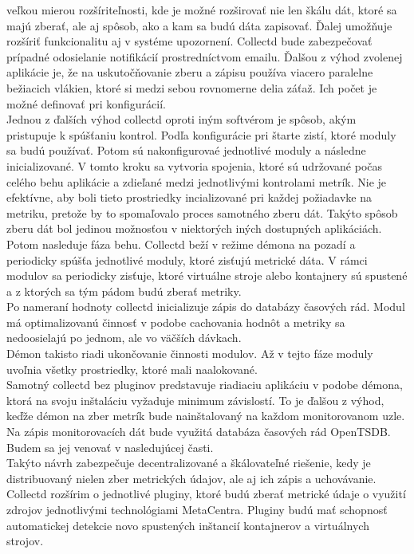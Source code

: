 \documentclass[printed,11pt,twoside,color,cover,table]{fithesis3}
\begin{document}
veľkou mierou rozšíriteľnosti, kde je možné rozširovať nie len škálu dát, ktoré sa majú zberať, ale aj spôsob, ako a kam sa budú dáta zapisovať. Ďalej umožňuje rozšíriť funkcionalitu
aj v systéme upozornení. Collectd bude zabezpečovať prípadné odosielanie notifikácií prostredníctvom emailu. Ďalšou z výhod zvolenej aplikácie je, že na uskutočňovanie zberu a zápisu používa viacero
paralelne bežiacich vlákien, ktoré si medzi sebou rovnomerne delia záťaž. Ich počet je možné definovať pri konfigurácií. 
\\Jednou z ďalších výhod collectd oproti iným softvérom je spôsob, akým pristupuje k spúšťaniu kontrol. Podľa konfigurácie pri štarte zistí, ktoré moduly sa budú používať. Potom sú nakonfigurovaé 
jednotlivé moduly a následne inicializované. V tomto kroku sa vytvoria spojenia, ktoré sú udržované počas celého behu aplikácie a zdieľané medzi jednotlivými kontrolami metrík. Nie je efektívne, aby boli 
tieto prostriedky incializované pri
každej požiadavke na metriku, pretože by to spomaľovalo proces samotného zberu dát. Takýto spôsob zberu dát bol jedinou možnosťou v niektorých iných dostupných aplikáciách.
\\Potom nasleduje fáza behu. Collectd beží v režime démona na pozadí a periodicky spúšťa jednotlivé moduly, ktoré zisťujú metrické dáta. 
V rámci modulov sa periodicky zisťuje, ktoré virtuálne stroje alebo kontajnery sú spustené a z ktorých sa tým pádom budú zberať metriky. 
\\Po nameraní hodnoty collectd inicializuje zápis do databázy časových rád. Modul má optimalizovanú činnosť v podobe cachovania
hodnôt a metriky sa nedoosielajú po jednom, ale vo väčších dávkach.
\\Démon takisto riadi ukončovanie činnosti modulov. Až v tejto fáze moduly uvoľnia všetky prostriedky, ktoré mali naalokované.
\\Samotný collectd bez pluginov predstavuje riadiaciu aplikáciu v podobe démona, ktorá na svoju inštaláciu vyžaduje minimum závislostí. To je ďalšou z výhod, keďže 
démon na zber metrík bude nainštalovaný na každom monitorovanom uzle.
\\Na zápis monitorovacích dát bude využitá databáza časových rád OpenTSDB. Budem sa jej venovať v nasledujúcej časti.
\\Takýto návrh zabezpečuje decentralizované a škálovateľné riešenie, kedy je distribuovaný nielen zber metrických údajov, ale aj ich zápis a uchovávanie.
\\Collectd rozšírim o jednotlivé pluginy, ktoré budú zberať metrické údaje o využití zdrojov jednotlivými technológiami MetaCentra. Pluginy budú 
mať schopnosť automatickej detekcie novo spustených inštancií kontajnerov a virtuálnych strojov.
\end{document}
